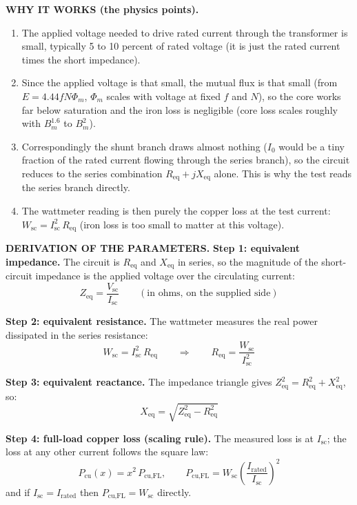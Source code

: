 \documentclass[11pt]{article}
\newcommand{\tagline}[1]{\textbf{\color{copper}#1}}
\begin{document}
\tagline{WHY IT WORKS (the physics points).}
\begin{enumerate}[label=\arabic*.]
\item The applied voltage needed to drive rated current through the transformer is small, typically 5 to 10 percent of rated voltage (it is just the rated current times the short impedance).
\item Since the applied voltage is that small, the mutual flux is that small (from $E = 4.44 f N \Phi_m$, $\Phi_m$ scales with voltage at fixed $f$ and $N$), so the core works far below saturation and the iron loss is negligible (core loss scales roughly with $B_m^{1.6}$ to $B_m^{2}$).
\item Correspondingly the shunt branch draws almost nothing ($I_0$ would be a tiny fraction of the rated current flowing through the series branch), so the circuit reduces to the series combination $R_{\text{eq}} + jX_{\text{eq}}$ alone. This is why the test reads the series branch directly.
\item The wattmeter reading is then purely the copper loss at the test current: $W_{\text{sc}} = I_{\text{sc}}^{2}\, R_{\text{eq}}$ (iron loss is too small to matter at this voltage).
\end{enumerate}

\tagline{DERIVATION OF THE PARAMETERS.}
\textbf{Step 1: equivalent impedance.} The circuit is $R_{\text{eq}}$ and $X_{\text{eq}}$ in series, so the magnitude of the short-circuit impedance is the applied voltage over the circulating current:
\[
Z_{\text{eq}} = \frac{V_{\text{sc}}}{I_{\text{sc}}}
\qquad (\text{in ohms, on the supplied side})
\]

\textbf{Step 2: equivalent resistance.} The wattmeter measures the real power dissipated in the series resistance:
\[
W_{\text{sc}} = I_{\text{sc}}^{2}\, R_{\text{eq}}
\qquad\Longrightarrow\qquad
R_{\text{eq}} = \frac{W_{\text{sc}}}{I_{\text{sc}}^{2}}
\]

\textbf{Step 3: equivalent reactance.} The impedance triangle gives $Z_{\text{eq}}^{2} = R_{\text{eq}}^{2} + X_{\text{eq}}^{2}$, so:
\[
X_{\text{eq}} = \sqrt{Z_{\text{eq}}^{2} - R_{\text{eq}}^{2}}
\]

\textbf{Step 4: full-load copper loss (scaling rule).} The measured loss is at $I_{\text{sc}}$; the loss at any other current follows the square law:
\[
P_{\text{cu}}(x) = x^{2}\, P_{\text{cu,FL}},
\qquad
P_{\text{cu,FL}} = W_{\text{sc}}\left(\frac{I_{\text{rated}}}{I_{\text{sc}}}\right)^{2}
\]
and if $I_{\text{sc}} = I_{\text{rated}}$ then $P_{\text{cu,FL}} = W_{\text{sc}}$ directly.
\end{document}
